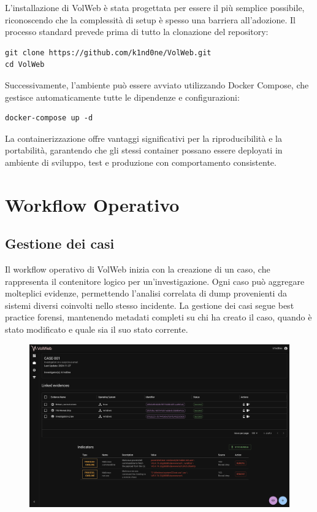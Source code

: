 L'installazione di VolWeb è stata progettata per essere il più semplice possibile, riconoscendo che la complessità di setup è spesso una barriera all'adozione. Il processo standard prevede prima di tutto la clonazione del repository:

\begin{verbatim}
git clone https://github.com/k1nd0ne/VolWeb.git
cd VolWeb
\end{verbatim}

Successivamente, l'ambiente può essere avviato utilizzando Docker Compose, che gestisce automaticamente tutte le dipendenze e configurazioni:

\begin{verbatim}
docker-compose up -d
\end{verbatim}

La containerizzazione offre vantaggi significativi per la riproducibilità e la portabilità, garantendo che gli stessi container possano essere deployati in ambiente di sviluppo, test e produzione con comportamento consistente.

\section{Workflow Operativo}

\subsection{Gestione dei casi}

Il workflow operativo di VolWeb inizia con la creazione di un caso, che rappresenta il contenitore logico per un'investigazione. Ogni caso può aggregare molteplici evidenze, permettendo l'analisi correlata di dump provenienti da sistemi diversi coinvolti nello stesso incidente. La gestione dei casi segue best practice forensi, mantenendo metadati completi su chi ha creato il caso, quando è stato modificato e quale sia il suo stato corrente.

\begin{figure}[H]
    \centering
    \includegraphics[width=1\linewidth]{images/volweb-original/volweb-case-management.png}
\end{figure}

